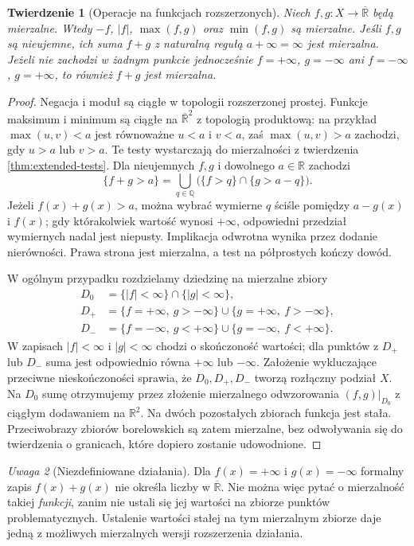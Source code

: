 \documentclass[11pt,a4paper,oneside]{book}
\numberwithin{equation}{chapter}
\theoremstyle{plain}
\newtheorem{twierdzenie}{Twierdzenie}[chapter]
\theoremstyle{definition}
\theoremstyle{remark}
\newtheorem{uwaga}[twierdzenie]{Uwaga}
\begin{document}
\begin{twierdzenie}[Operacje na funkcjach rozszerzonych]
\label{thm:extended-operations}
Niech $f,g:X\to\overline{\mathbb R}$ będą mierzalne.
Wtedy $-f$, $|f|$, $\max(f,g)$ oraz $\min(f,g)$
są mierzalne. Jeśli $f,g$ są nieujemne, ich suma
$f+g$ z naturalną regułą $a+\infty=\infty$
jest mierzalna. Jeżeli nie zachodzi w żadnym punkcie
jednocześnie $f=+\infty$, $g=-\infty$ ani
$f=-\infty$, $g=+\infty$, to również $f+g$ jest mierzalna.
\end{twierdzenie}
\begin{proof}
Negacja i moduł są ciągłe w topologii rozszerzonej
prostej. Funkcje maksimum i minimum są ciągłe na
$\overline{\mathbb R}^2$ z topologią produktową:
na przykład $\max(u,v)<a$ jest równoważne
$u<a$ i $v<a$, zaś $\max(u,v)>a$ zachodzi,
gdy $u>a$ lub $v>a$. Te testy wystarczają do
mierzalności z twierdzenia \ref{thm:extended-tests}.
Dla nieujemnych $f,g$ i dowolnego $a\in\mathbb R$
zachodzi
\[
\{f+g>a\}=\bigcup_{q\in\mathbb Q}
\bigl(\{f>q\}\cap\{g>a-q\}\bigr).
\]
Jeżeli $f(x)+g(x)>a$, można wybrać wymierne $q$
ściśle pomiędzy $a-g(x)$ i $f(x)$; gdy którakolwiek
wartość wynosi $+\infty$, odpowiedni przedział
wymiernych nadal jest niepusty. Implikacja odwrotna
wynika przez dodanie nierówności. Prawa strona
jest mierzalna, a test na półprostych kończy dowód.

W ogólnym przypadku rozdzielamy dziedzinę na mierzalne
zbiory
\[
\begin{aligned}
D_0&=\{|f|<\infty\}\cap\{|g|<\infty\},\\
D_+&=\{f=+\infty,\ g>-\infty\}
      \cup\{g=+\infty,\ f>-\infty\},\\
D_-&=\{f=-\infty,\ g<+\infty\}
      \cup\{g=-\infty,\ f<+\infty\}.
\end{aligned}
\]
W zapisach $|f|<\infty$ i $|g|<\infty$ chodzi o
skończoność wartości; dla punktów z $D_+$ lub $D_-$
suma jest odpowiednio równa $+\infty$ lub $-\infty$.
Założenie wykluczające przeciwne nieskończoności
sprawia, że $D_0,D_+,D_-$ tworzą rozłączny podział
$X$. Na $D_0$ sumę otrzymujemy przez złożenie
mierzalnego odwzorowania $(f,g)|_{D_0}$ z ciągłym
dodawaniem na $\mathbb R^2$. Na dwóch pozostałych
zbiorach funkcja jest stała. Przeciwobrazy
zbiorów borelowskich są zatem mierzalne, bez
odwoływania się do twierdzenia o granicach,
które dopiero zostanie udowodnione.
\end{proof}

\begin{uwaga}[Niezdefiniowane działania]
Dla $f(x)=+\infty$ i $g(x)=-\infty$ formalny zapis
$f(x)+g(x)$ nie określa liczby w $\overline{\mathbb R}$.
Nie można więc pytać o mierzalność takiej \emph{funkcji},
zanim nie ustali się jej wartości na zbiorze punktów
problematycznych. Ustalenie wartości stałej na tym
mierzalnym zbiorze daje jedną z możliwych mierzalnych
wersji rozszerzenia działania.
\end{uwaga}
\end{document}
